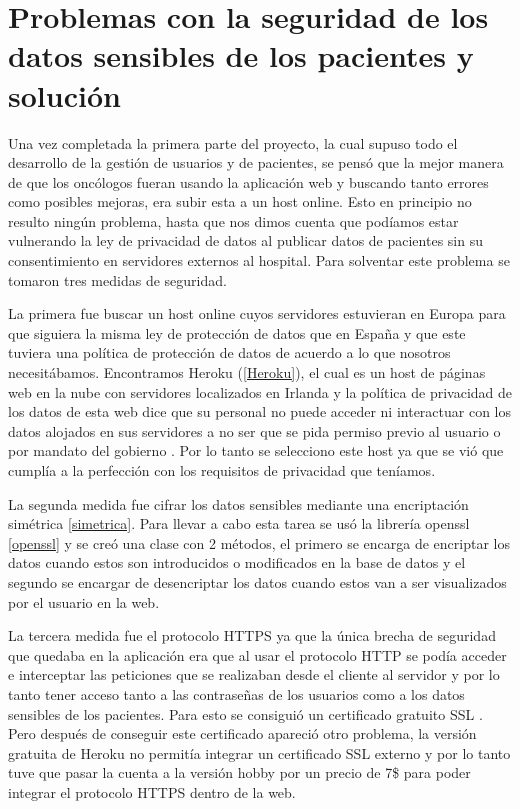 \section{Problemas con la seguridad de los datos sensibles de los pacientes y solución} \label{seguridad}

Una vez completada la primera parte del proyecto, la cual supuso todo el desarrollo de la gestión de usuarios y de pacientes, se pensó que la mejor manera de que los oncólogos fueran usando la aplicación web y buscando tanto errores como posibles mejoras, era subir esta a un host online. Esto en principio no resulto ningún problema, hasta que nos dimos cuenta que podíamos estar vulnerando la ley de privacidad de datos al publicar datos de pacientes sin su consentimiento en servidores externos al hospital. Para solventar este problema se tomaron tres medidas de seguridad.

La primera fue buscar un host online cuyos servidores estuvieran en Europa para que siguiera la misma ley de protección de datos que en España y que este tuviera una política de protección de datos de acuerdo a lo que nosotros necesitábamos. Encontramos Heroku (\ref{Heroku}), el cual es un host de páginas web en la nube con servidores localizados en Irlanda \cite{herokulocalizacion} y la política de privacidad de los datos de esta web dice que su personal no puede acceder ni interactuar con los datos alojados en sus servidores a no ser que se pida permiso previo al usuario o por mandato del gobierno \cite{herokuprivacidad}. Por lo tanto se selecciono este host ya que se vió que cumplía a la perfección con los requisitos de privacidad que teníamos. 

La segunda medida fue cifrar los datos sensibles mediante una encriptación simétrica \ref{simetrica}. Para llevar a cabo esta tarea se usó la librería openssl \ref{openssl} y se creó una clase con 2 métodos, el primero se encarga de encriptar los datos cuando estos son introducidos o modificados en la base de datos y el segundo se encargar de desencriptar los datos cuando estos van a ser visualizados por el usuario en la web. 

La tercera medida fue el protocolo HTTPS ya que la única brecha de seguridad que quedaba en la aplicación era que al usar el protocolo HTTP se podía acceder e interceptar las peticiones que se realizaban desde el cliente al servidor y por lo tanto tener acceso tanto a las contraseñas de los usuarios como a los datos sensibles de los pacientes. Para esto se consiguió un certificado gratuito SSL \cite{ssl}. Pero después de conseguir este certificado apareció otro problema, la versión gratuita de Heroku no permitía integrar un certificado SSL externo y por lo tanto tuve que pasar la cuenta a la versión hobby por un precio de 7\$ para poder integrar el protocolo HTTPS dentro de la web.

